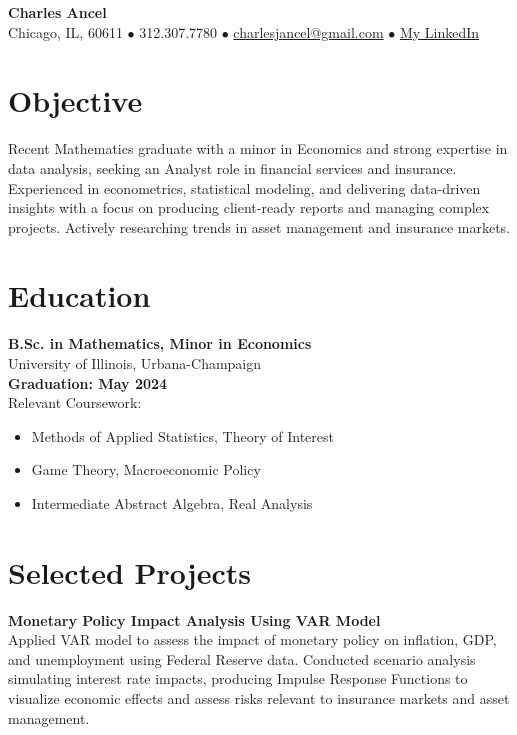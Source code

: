 \documentclass[10pt]{article}
\begin{document}
\begin{center}
{\Large\textbf{Charles Ancel}}\\
\vspace{5pt}
\small{Chicago, IL, 60611 \(\bullet\) 312.307.7780 \(\bullet\) \href{mailto:charlesjancel@gmail.com}{charlesjancel@gmail.com} \(\bullet\) \href{https://www.linkedin.com/in/charles-j-ancel/}{My LinkedIn}}
\end{center}
\vspace{-10pt}

\section*{Objective}
\vspace{0pt}
Recent Mathematics graduate with a minor in Economics and strong expertise in data analysis, seeking an Analyst role in financial services and insurance. Experienced in econometrics, statistical modeling, and delivering data-driven insights with a focus on producing client-ready reports and managing complex projects. Actively researching trends in asset management and insurance markets.

\vspace{-10pt}
\section*{Education}
\vspace{0pt}
\begin{multicols}{2}
\textbf{B.Sc. in Mathematics, Minor in Economics} \\
University of Illinois, Urbana-Champaign \\
\textbf{Graduation: May 2024} \\

Relevant Coursework:
\begin{itemize}[noitemsep,nosep]
    \item Methods of Applied Statistics, Theory of Interest
    \item Game Theory, Macroeconomic Policy
    \item Intermediate Abstract Algebra, Real Analysis
\end{itemize}
\end{multicols}

\vspace{-10pt}
\section*{Selected Projects}
\vspace{0pt}
\textbf{Monetary Policy Impact Analysis Using VAR Model} \\
Applied VAR model to assess the impact of monetary policy on inflation, GDP, and unemployment using Federal Reserve data. Conducted scenario analysis simulating interest rate impacts, producing Impulse Response Functions to visualize economic effects and assess risks relevant to insurance markets and asset management.
\end{document}
